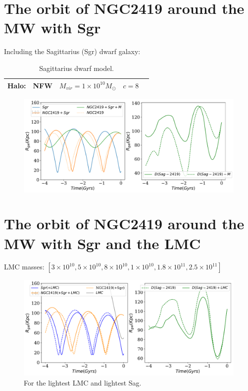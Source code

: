 \documentclass[14pt]{article}
\begin{document}
\section{The orbit of NGC2419 around the MW with Sgr}

Including the Sagittarius (Sgr) dwarf galaxy:


\begin{table}[H]
\centering
\begin{tabular}{c c c c c}
\hline
\hline
Halo: & NFW & $M_{vir} = 1\times 10^{10} M_{\odot}$ & $c=8$  \\
\hline
\hline
\end{tabular}
\caption{Sagittarius dwarf model.}
\end{table}


\begin{figure}[H]
\centering
\includegraphics[scale=0.5]{../exploratory_code/NGC2419_sphMWSGR.pdf}
\end{figure}


\section{The orbit of NGC2419 around the MW with Sgr and the LMC}

LMC masses: $[3\times10^{10}, 5\times10^{10}, 8\times10^{10},
1\times10^{10}, 1.8\times10^{11}, 2.5\times10^{11}]$



\begin{figure}[H]
\centering
\includegraphics[scale=0.5]{../exploratory_code/NGC2419_sphMWSGRLMC.pdf}
\caption{For the lightest LMC and lightest Sag.}
\end{figure}
\end{document}
